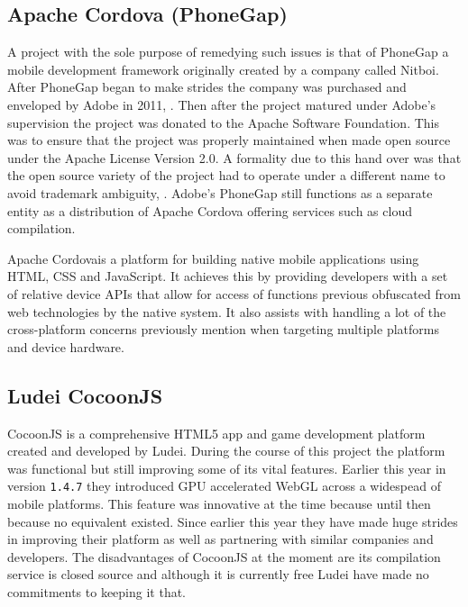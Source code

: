 \documentclass[final]{cmpreport}
\begin{document}
\subsection{Apache Cordova (PhoneGap)}
A project with the sole purpose of remedying such issues is that of PhoneGap a mobile development framework originally created by a company called Nitboi. After PhoneGap began to make strides the company was purchased and enveloped by Adobe in 2011, \cite{Adobe}. Then after the project matured under Adobe's supervision the project was donated to the Apache Software Foundation. This was to ensure that the project was properly maintained when made open source under the Apache License Version 2.0\footnotemark. A formality due to this hand over was that the open source variety of the project had to operate under a different name to avoid trademark ambiguity, \cite{Leroux}. Adobe's PhoneGap still functions as a separate entity as a distribution of Apache Cordova offering services such as cloud compilation\footnotemark.


Apache Cordova\footnotemark is a platform for building native mobile applications using HTML, CSS and JavaScript. It achieves this by providing developers with a set of relative device APIs that allow for access of functions previous obfuscated from web technologies by the native system. It also assists with handling a lot of the cross-platform concerns previously mention when targeting multiple platforms and device hardware.


\subsection{Ludei CocoonJS}
CocoonJS is a comprehensive HTML5 app and game development platform created and developed by Ludei. During the course of this project the platform was functional but still improving some of its vital features. Earlier this year in version \texttt{1.4.7} they introduced \footnotemark GPU accelerated WebGL across a widespead of mobile platforms. This feature was innovative at the time because until then because no equivalent existed. Since earlier this year they have made huge strides in improving their platform as well as partnering with similar companies and developers. The disadvantages of CocoonJS at the moment are its compilation service is closed source and although it is currently free Ludei have made no commitments to keeping it that.
\end{document}
